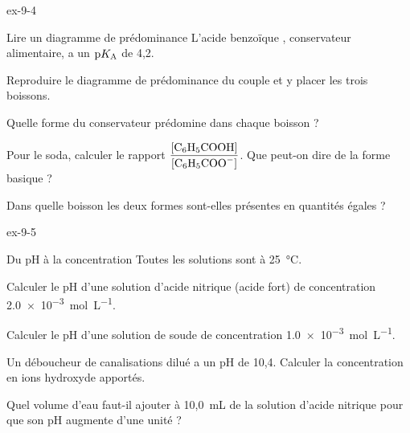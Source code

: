 \begin{blocLivre}{ex-9-4}
\begin{exercice}[1]{Lire un diagramme de prédominance}
L'acide benzoïque , conservateur alimentaire, a un $\mathrm{p}K_{\mathrm{A}}$ de 4,2.
\begin{questions}
\item Reproduire le diagramme de prédominance du couple et y placer les trois boissons.
\item Quelle forme du conservateur prédomine dans chaque boisson ?
\item Pour le soda, calculer le rapport $\dfrac{[\ce{C6H5COOH}]}{[\ce{C6H5COO-}]}$. Que peut-on dire de la forme
basique ?
\item Dans quelle boisson les deux formes sont-elles présentes en quantités égales ?
\end{questions}
\end{exercice}
\end{blocLivre}
\begin{blocLivre}{ex-9-5}
\begin{exercice}[1]{Du pH à la concentration}
Toutes les solutions sont à 25~°C.
\begin{questions}
\item Calculer le pH d'une solution d'acide nitrique (acide fort) de concentration \qty{2,0e-3}{mol.L^{-1}}.
\item Calculer le pH d'une solution de soude de concentration \qty{1,0e-3}{mol.L^{-1}}.
\item Un déboucheur de canalisations dilué a un pH de 10,4. Calculer la concentration en ions hydroxyde apportés.
\item Quel volume d'eau faut-il ajouter à 10,0~mL de la solution d'acide nitrique pour que son pH augmente d'une
unité ?
\end{questions}
\end{exercice}
\end{blocLivre}

